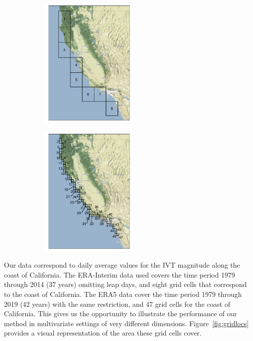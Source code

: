 \begin{figure}[tb]
    \begin{center}
    \caption{Grid cell locations for ERA-Interim (left) and ERA5 (right).\label{fig:gridlocs}}
    \begin{subfigure}[b]{0.48\textwidth}
        \centering 
        \includegraphics[height=2.5in]{./images/erai_grid}
    \end{subfigure}
    \begin{subfigure}[b]{0.48\textwidth}
        \centering
        \includegraphics[height=2.5in]{./images/era5_grid}
    \end{subfigure}
    \end{center}
\end{figure}

Our data correspond to daily average values for the IVT magnitude
    along the coast of California.  The ERA-Interim data used covers the time period 
    1979 through 2014 (37 years) omitting leap days, and eight grid cells that 
    correspond to the coast of California.  The ERA5 data cover the time period 
    1979 through 2019 (42 years) with the same restriction, and  47 grid cells for 
    the coast of California.  This gives us the opportunity to illustrate the 
    performance of our method in multivariate settings of very different dimensions. 
    Figure~\ref{fig:gridlocs} provides a visual representation of the area these grid 
    cells cover.

